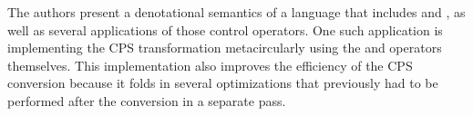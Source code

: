 \documentclass[letterpaper]{llncs}
\begin{document}
The authors present a denotational semantics of a language that includes \shiftfn and \resetfn, as well as several applications of those control operators. One such application is implementing the CPS transformation metacircularly using the \shiftfn and \resetfn operators themselves. This implementation also improves the efficiency of the CPS conversion because it folds in several optimizations that previously had to be performed after the conversion in a separate pass.








\end{document}
